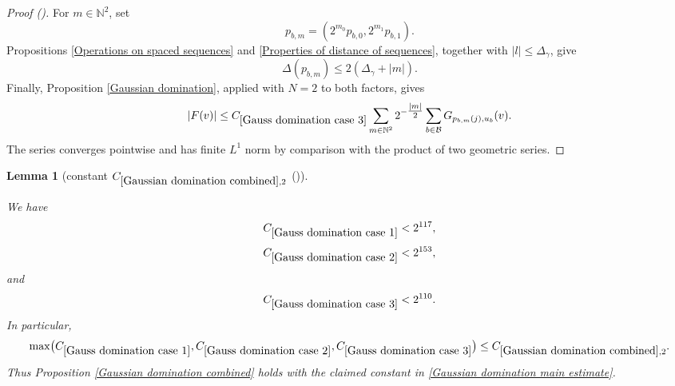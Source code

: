 \documentclass[12pt,reqno]{amsart}
\newcommand{\auto}{{({\tiny\faCar})}}
\theoremstyle{plain}
\newtheorem{lemma}[theorem]{Lemma}
\numberwithin{equation}{section}
\theoremstyle{remark}
\newcommand{\uses}[1]{}
\newcommand{\usesdefs}[1]{}
\newcommand{\leanok}{}
\newcommand{\lean}[1]{}
\newcommand{\N}{{\mathbb N}}
\begin{document}
\begin{proof}[Proof \auto]
For $m\in\N^2$, set
\[
p_{b,m}=(2^{m_0}p_{b,0},2^{m_1}p_{b,1}).
\]
Propositions \ref{Operations on spaced sequences} and
\ref{Properties of distance of sequences}, together with
$|l|\le\Delta_\gamma$, give
\[
\Delta(p_{b,m})
\le
2(\Delta_\gamma+|m|).
\]
Finally, Proposition \ref{Gaussian domination}, applied with $N=2$ to both factors, gives
\[
|F(v)|
\le
C_{\ref{Gauss domination case 3}}
\sum_{m\in\N^2}2^{-\tfrac{|m|}{2}}
\sum_{b\in\mathcal B}
G_{p_{b,m}(j),u_b}(v).
\]
The series converges pointwise and has finite $L^1$ norm by comparison with the product of two geometric series.

\medskip
\end{proof}

\begin{lemma}[constant $C_{\ref{Gaussian domination combined},2}$ \auto]\label{Gauss domination constant}\uses{standard bump properties,constant four scale Gaussian kernel,constant mean four scale Gaussian kernel,four scale Gaussian kernel,mean four scale Gaussian kernel,constant H kernel estimate Gaussian domination,constant H kernel derivative estimate Gaussian domination,H kernel estimate Gaussian domination,H kernel derivative estimate Gaussian domination,two bump estimate,bump triangle,Gauss domination case 1,Gauss domination case 2,Gauss domination case 3}\usesdefs{}
\lean{Auto.gaussDominationConstant}
\leanok
We have
\begin{equation}\label{auto:Gaussian-domination-case-constant-bounds}
C_{\ref{Gauss domination case 1}}<2^{117},
\end{equation}
\begin{equation}\label{auto:Gaussian-domination-case-two-constant-bound}
C_{\ref{Gauss domination case 2}}<2^{153},
\end{equation}
and
\begin{equation}\label{auto:Gaussian-domination-case-three-constant-bound}
C_{\ref{Gauss domination case 3}}<2^{110}.
\end{equation}
In particular,
\begin{equation}\label{auto:Gaussian-domination-common-constant-bound}
\max\bigl(C_{\ref{Gauss domination case 1}},C_{\ref{Gauss domination case 2}},C_{\ref{Gauss domination case 3}}\bigr)
\le C_{\ref{Gaussian domination combined},2}.
\end{equation}
Thus Proposition \ref{Gaussian domination combined} holds with the claimed constant in \eqref{Gaussian domination main estimate}.
\end{lemma}
\end{document}
